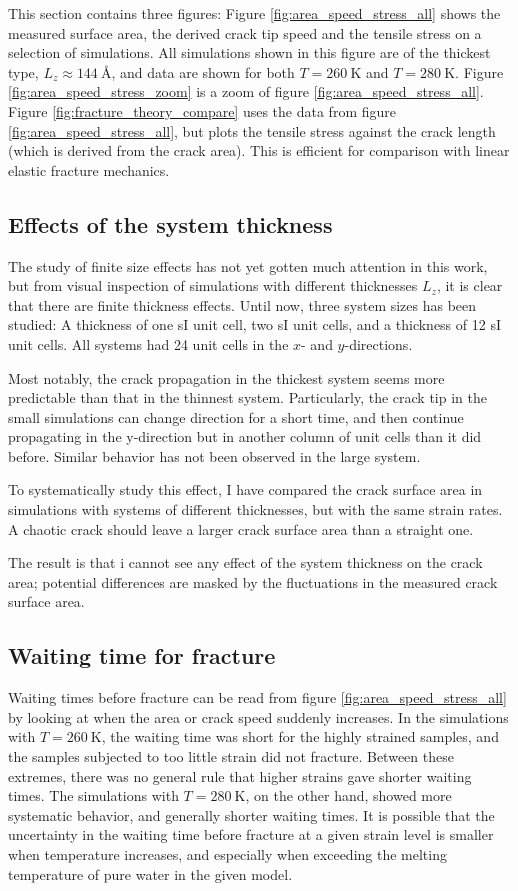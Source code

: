 This section contains three figures:
Figure \ref{fig:area_speed_stress_all} shows the measured surface area, the derived crack tip speed and the tensile stress on a selection of simulations. All simulations shown in this figure are of the thickest type, $L_z \approx \SI{144}{\angstrom}$, and data are shown for both $T = \SI{260}{\kelvin}$ and $T = \SI{280}{\kelvin}$. Figure \ref{fig:area_speed_stress_zoom} is a zoom of figure \ref{fig:area_speed_stress_all}. Figure \ref{fig:fracture_theory_compare} uses the data from figure \ref{fig:area_speed_stress_all}, but plots the tensile stress against the crack length (which is derived from the crack area). This is efficient for comparison with linear elastic fracture mechanics.

\subsection{Effects of the system thickness}
The study of finite size effects has not yet gotten much attention in this work, but from visual inspection of simulations with different thicknesses $L_z$, it is clear that there are finite thickness effects. Until now, three system sizes has been studied: A thickness of one sI unit cell, two sI unit cells, and a thickness of 12 sI unit cells. All systems had 24 unit cells in the $x$- and $y$-directions.

Most notably, the crack propagation in the thickest system seems more predictable than that in the thinnest system. Particularly, the crack tip in the small simulations can change direction for a short time, and then continue propagating in the y-direction but in another column of unit cells than it did before. Similar behavior has not been observed in the large system.

To systematically study this effect, I have compared the crack surface area in simulations with systems of different thicknesses, but with the same strain rates. A chaotic crack should leave a larger crack surface area than a straight one.

The result is that i cannot see any effect of the system thickness on the crack area; potential differences are masked by the fluctuations in the measured crack surface area.

\subsection{Waiting time for fracture}
Waiting times before fracture can be read from figure \ref{fig:area_speed_stress_all} by looking at when the area or crack speed suddenly increases. In the simulations with $T=\SI{260}{\kelvin}$, the waiting time was short for the highly strained samples, and the samples subjected to too little strain did not fracture. Between these extremes, there was no general rule that higher strains gave shorter waiting times. The simulations with $T=\SI{280}{\kelvin}$, on the other hand, showed more systematic behavior, and generally shorter waiting times. It is possible that the uncertainty in the waiting time before fracture at a given strain level is smaller when temperature increases, and especially when exceeding the melting temperature of pure water in the given model. 

